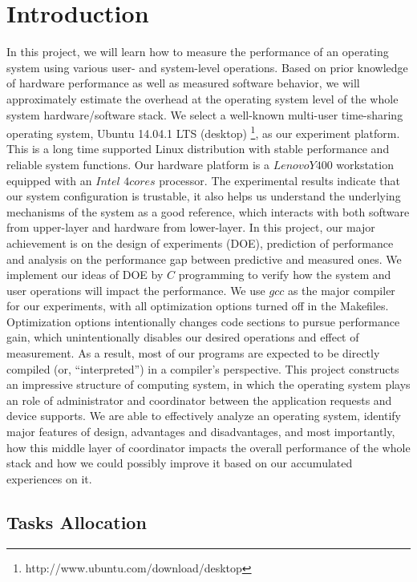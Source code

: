 \section{Introduction}
\label{sec:int}
In this project, we will learn how to measure the performance of an operating system using various user- and system-level operations. Based on prior knowledge of hardware performance as well as measured software behavior, we will approximately estimate the overhead at the operating system level of the whole system hardware/software stack. We select a well-known multi-user time-sharing operating system, Ubuntu 14.04.1 LTS (desktop) \footnote{http://www.ubuntu.com/download/desktop}, as our experiment platform. This is a long time supported Linux distribution with stable performance and reliable system functions. Our hardware platform is a $Lenovo Y400$  workstation equipped with an $Intel$  $4 cores$ processor. The experimental results indicate that our system configuration is trustable, it also helps us understand the underlying mechanisms of the system as a good reference, which interacts with both software from upper-layer and hardware from lower-layer.
In this project, our major achievement is on the design of experiments (DOE), prediction of performance and analysis on the performance gap between predictive and measured ones. We implement our ideas of DOE by $C$ programming to verify how the system and user operations will impact the performance. We use $gcc$ as the major compiler for our experiments, with all optimization options turned off in the Makefiles. Optimization options intentionally changes code sections to pursue performance gain, which unintentionally disables our desired operations and effect of measurement. As a result, most of our programs are expected to be directly compiled (or, ``interpreted'') in a compiler's perspective.
This project constructs an impressive structure of computing system, in which the operating system plays an role of administrator and coordinator between the application requests and device supports. We are able to effectively analyze an operating system, identify major features of design, advantages and disadvantages, and most importantly, how this middle layer of coordinator impacts the overall performance of the whole stack and how we could possibly improve it based on our accumulated experiences on it.

\subsection{Tasks Allocation}

